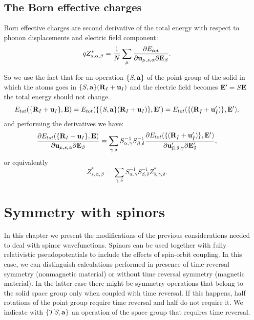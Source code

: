 \documentclass[12pt,a4paper,twoside]{report}
\begin{document}
\section{The Born effective charges}
Born effective charges are second derivative of the total energy with respect to phonon displacements and electric field component:
\begin{equation}
qZ^*_{s,\alpha,\beta}= {1\over N} \sum_\mu {\partial E_{tot} \over \partial {\bf u}_{\mu,s,\alpha} \partial {\bf E}_\beta}.
\end{equation}

So we use the fact that for an operation $\{S,{\bf a}\}$ of the point group of the solid in which the atoms goes in $\{S,{\bf a}\} ({\bf R}_I+{\bf u}_I)$ and the electric field becomes 
${\bf E}'=S{\bf E}$ the total energy should not change.
\begin{equation}
E_{tot}(\{{\bf R}_I+{\bf u}_I\},{\bf E}) =
E_{tot}(\{\{S,{\bf a}\}({\bf R}_I+{\bf u}_I)\},{\bf E}')
=E_{tot}(\{({\bf R}_{\bar I}+{\bf u}'_{\bar I})\},{\bf E}'),
\end{equation}
and performing the derivatives we have:
\begin{equation}
{\partial E_{tot}(\{{\bf R}_I+{\bf u}_I\},{\bf E}) \over  \partial {\bf u}_{\mu,s,\alpha} \partial {\bf E}_\beta} = \sum_{\gamma,\delta} S^{-1}_{\alpha,\gamma} S^{-1}_{\beta,\delta} {\partial 
E_{tot}(\{({\bf R}_{\bar I}+{\bf u}'_{\bar I})\},{\bf E}')
\over \partial {\bf u}'_{\bar \mu,\bar s,\gamma} \partial {\bf E}'_\delta},
\end{equation}
or equivalently
\begin{equation}
Z^*_{s,\alpha,\beta}
= \sum_{\gamma,\delta} S^{-1}_{\alpha,\gamma} S^{-1}_{\beta,\delta} 
Z^*_{\bar s,\gamma,\delta}.
\end{equation}

\newpage
{\color{dark-blue}\chapter{Symmetry with spinors}}
In this chapter we present the modifications of the previous considerations needed to deal with spinor wavefunctions.
Spinors can be used together with fully relativistic pseudopotentials to include the effects of spin-orbit coupling. In this case, we can distinguish calculations performed in presence of time-reversal symmetry (nonmagnetic material) or without time reversal symmetry (magnetic material). In the latter case there might be symmetry operations that belong to the solid space group only when coupled with time reversal. If this happens, half rotations of the point group require time reversal and half do not require it. We indicate with $\{\mathcal{T}S,{\bf a}\}$ an operation of the space group that requires time reversal. 
\end{document}
